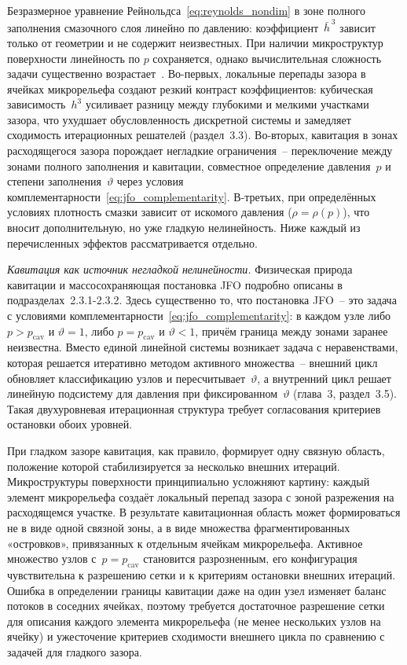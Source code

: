 Безразмерное уравнение Рейнольдса~\eqref{eq:reynolds_nondim}
в зоне полного заполнения смазочного слоя линейно по давлению:
коэффициент~$\bar{h}^{\,3}$ зависит только от геометрии
и не содержит неизвестных. При наличии микроструктур
поверхности линейность по $p$ сохраняется, однако
вычислительная сложность задачи существенно возрастает~\cite{miraskari2018a,miraskari2018b}.
Во-первых, локальные перепады зазора в ячейках микрорельефа
создают резкий контраст коэффициентов: кубическая
зависимость~$h^3$ усиливает разницу между глубокими и мелкими
участками зазора, что ухудшает обусловленность дискретной
системы и замедляет сходимость итерационных решателей
(раздел~3.3). Во-вторых, кавитация в зонах расходящегося
зазора порождает негладкие ограничения~-- переключение между
зонами полного заполнения и кавитации, совместное определение
давления~$p$ и степени заполнения~$\vartheta$ через условия
комплементарности~\eqref{eq:jfo_complementarity}. В-третьих,
при определённых условиях плотность смазки зависит от искомого
давления ($\rho = \rho(p)$), что вносит дополнительную, но уже
гладкую нелинейность. Ниже каждый из перечисленных эффектов
рассматривается отдельно.

\textit{Кавитация как источник негладкой нелинейности.}
Физическая природа кавитации и массосохраняющая постановка JFO
подробно описаны в подразделах~2.3.1-2.3.2. Здесь существенно
то, что постановка JFO~-- это задача с условиями
комплементарности~\eqref{eq:jfo_complementarity}: в каждом узле
либо $p > p_{\mathrm{cav}}$ и $\vartheta = 1$, либо
$p = p_{\mathrm{cav}}$ и $\vartheta < 1$, причём граница между
зонами заранее неизвестна. Вместо единой линейной системы
возникает задача с неравенствами, которая решается итеративно
методом активного множества~-- внешний цикл обновляет
классификацию узлов и пересчитывает~$\vartheta$, а внутренний
цикл решает линейную подсистему для давления при
фиксированном~$\vartheta$ (глава~3, раздел~3.5). Такая
двухуровневая итерационная структура требует согласования
критериев остановки обоих уровней.

При гладком зазоре кавитация, как правило, формирует одну
связную область, положение которой стабилизируется за несколько
внешних итераций. Микроструктуры поверхности принципиально
усложняют картину: каждый элемент микрорельефа создаёт
локальный перепад зазора с зоной разрежения на расходящемся
участке. В результате кавитационная область может формироваться
не в виде одной связной зоны, а в виде множества
фрагментированных «островков», привязанных к отдельным ячейкам
микрорельефа. Активное множество узлов
с~$p = p_{\mathrm{cav}}$ становится разрозненным, его
конфигурация чувствительна к разрешению сетки и к критериям
остановки внешних итераций. Ошибка в определении границы
кавитации даже на один узел изменяет баланс потоков в соседних
ячейках, поэтому требуется достаточное разрешение сетки для
описания каждого элемента микрорельефа (не менее нескольких
узлов на ячейку) и ужесточение критериев сходимости внешнего
цикла по сравнению с задачей для гладкого зазора.

